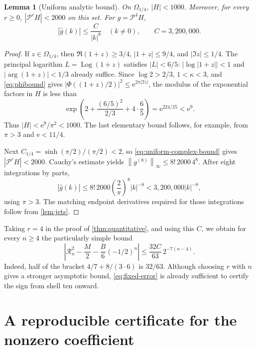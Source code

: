\documentclass[11pt,a4paper]{article}
\newtheorem{lemma}[theorem]{Lemma}
\theoremstyle{definition}
\theoremstyle{remark}
\newcommand{\e}{\mathrm e}
\newcommand{\Pop}{\mathcal P}
\newcommand{\Log}{\operatorname{Log}}
\newcommand{\abs}[1]{\left|#1\right|}
\newcommand{\norm}[1]{\left\|#1\right\|}
\numberwithin{equation}{section}
\begin{document}
\begin{lemma}[Uniform analytic bound]
\label{lem:Hbound}
On $\Omega_{1/4}$, $|H|<1000$. Moreover, for every $r\ge0$,
$|\Pop^rH|<2000$ on this set. For $g=\Pop^4H$,
\begin{equation}
 |\widehat g(k)|\le \frac{C}{|k|^8}\quad(k\ne0),
 \qquad C=3{,}200{,}000.
 \label{eq:certificate-C}
\end{equation}
\end{lemma}
\begin{proof}
If $z\in\Omega_{1/4}$, then
$\Re(1+z)\ge3/4$, $|1+z|\le9/4$, and $|\Im z|\le1/4$.
The principal logarithm $L=\Log(1+z)$ satisfies $|L|<6/5$:
$|\log|1+z||<1$ and $|\arg(1+z)|<1/3$ already suffice.
Since $\log2>2/3$, $1<\kappa<3$, and \cref{eq:phibound} gives
$|\Phi((1+z)/2)|^2\le\e^{2\pi|\Im z|}$, the modulus of the exponential
factors in $H$ is less than
\[
 \exp\!\left(2+\frac{(6/5)^2}{2/3}+4\cdot\frac65\right)
 =\e^{224/25}<\e^9.
\]
Thus $|H|<\e^9/\pi^2<1000$. The last elementary bound follows, for
example, from $\pi>3$ and $\e<11/4$.

Next $C_{1/4}=\sinh(\pi/2)/(\pi/2)<2$, so
\cref{eq:uniform-complex-bound} gives $|\Pop^rH|<2000$.
Cauchy's estimate yields $\norm{g^{(8)}}_\infty\le8!\,2000\,4^8$.
After eight integrations by parts,
\[
 |\widehat g(k)|\le
 8!\,2000\left(\frac{2}{\pi}\right)^8|k|^{-8}
 <3{,}200{,}000|k|^{-8},
\]
using $\pi>3$. The matching endpoint derivatives required for those
integrations follow from \cref{lem:jets}.
\end{proof}

Taking $r=4$ in the proof of \cref{thm:quantitative}, and using this $C$,
we obtain for every $n\ge4$ the particularly simple bound
\begin{equation}
 \boxed{\displaystyle
 \abs{\mathcal R_n^2-\frac M2-\frac B6(-1/2)^n}
 \le \frac{32C}{63}\,2^{-7(n-4)}.}
 \label{eq:fixed-error}
\end{equation}
Indeed, half of the bracket $4/7+8/(3\cdot6)$ is $32/63$.
Although choosing $r$ with $n$ gives a stronger asymptotic bound,
\cref{eq:fixed-error} is already sufficient to certify the sign from shell
ten onward.

\section{A reproducible certificate for the nonzero coefficient}
\label{sec:certificate}
\end{document}
